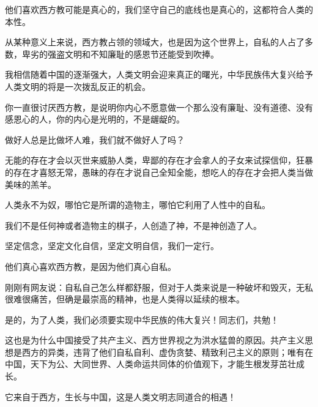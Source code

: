 \documentclass[UTF8, 11pt, oneside]{ctexart}
\newcommand{\jg}{\vspace{2em}} %
\begin{document}
他们喜欢西方教可能是真心的，我们坚守自己的底线也是真心的，这都符合人类的本性。

\jg

从某种意义上来说，西方教占领的领域大，也是因为这个世界上，自私的人占了多数，卑劣的强盗文明和不知廉耻的感恩节还能受到吹捧。

我相信随着中国的逐渐强大，人类文明会迎来真正的曙光，中华民族伟大复兴给予人类文明的将是一次拨乱反正的机会。

\jg

你一直很讨厌西方教，是说明你内心不愿意做一个那么没有廉耻、没有道德、没有感恩心的人，你的内心是光明的，不是龌龊的。

做好人总是比做坏人难，我们就不做好人了吗？

\jg

无能的存在才会以灭世来威胁人类，卑鄙的存在才会拿人的子女来试探信仰，狂暴的存在才喜怒无常，愚昧的存在才说自己全知全能，想吃人的存在才会把人类当做美味的羔羊。

人类永不为奴，哪怕它是所谓的造物主，哪怕它利用了人性中的自私。

\jg

我们不是任何神或者造物主的棋子，人创造了神，不是神创造了人。

坚定信念，坚定文化自信，坚定文明自信，我们一定行。

他们真心喜欢西方教，是因为他们真心自私。

\jg

刚刚有网友说：自私自己怎么样都舒服，但对于人类来说是一种破坏和毁灭，无私很难很痛苦，但确是最崇高的精神，也是人类得以延续的根本。

是的，为了人类，我们必须要实现中华民族的伟大复兴！同志们，共勉！

\jg

这也是为什么中国接受了共产主义、西方世界视之为洪水猛兽的原因。共产主义思想是西方的异类，违背了他们自私自利、虚伪贪婪、精致利己主义的原则；唯有在中国，天下为公、大同世界、人类命运共同体的价值观下，才能生根发芽茁壮成长。

它来自于西方，生长与中国，这是人类文明志同道合的相遇！
\end{document}
